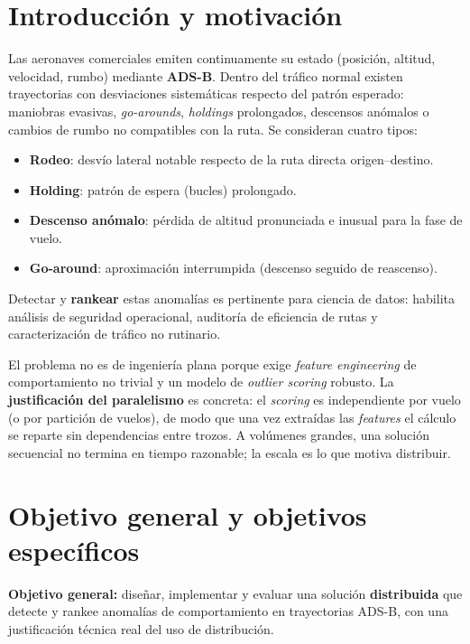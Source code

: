 \documentclass[letterpaper,11pt]{article}
\begin{document}
\section{Introducción y motivación}
Las aeronaves comerciales emiten continuamente su estado (posición, altitud, velocidad, rumbo) mediante
\textbf{ADS-B}. Dentro del tráfico normal existen trayectorias con desviaciones sistemáticas respecto del
patrón esperado: maniobras evasivas, \emph{go-arounds}, \emph{holdings} prolongados, descensos anómalos o
cambios de rumbo no compatibles con la ruta. Se consideran cuatro tipos:
\begin{itemize}[nosep,leftmargin=1.3em]
  \item \textbf{Rodeo}: desvío lateral notable respecto de la ruta directa origen--destino.
  \item \textbf{Holding}: patrón de espera (bucles) prolongado.
  \item \textbf{Descenso anómalo}: pérdida de altitud pronunciada e inusual para la fase de vuelo.
  \item \textbf{Go-around}: aproximación interrumpida (descenso seguido de reascenso).
\end{itemize}
Detectar y \textbf{rankear} estas anomalías es pertinente para ciencia de datos: habilita análisis de
seguridad operacional, auditoría de eficiencia de rutas y caracterización de tráfico no rutinario.

El problema no es de ingeniería plana porque exige \emph{feature engineering} de comportamiento no
trivial y un modelo de \emph{outlier scoring} robusto. La \textbf{justificación del paralelismo} es
concreta: el \emph{scoring} es independiente por vuelo (o por partición de vuelos), de modo que una vez
extraídas las \emph{features} el cálculo se reparte sin dependencias entre trozos. A volúmenes grandes,
una solución secuencial no termina en tiempo razonable; la escala es lo que motiva distribuir.

\section{Objetivo general y objetivos específicos}
\textbf{Objetivo general:} diseñar, implementar y evaluar una solución \textbf{distribuida} que detecte y
rankee anomalías de comportamiento en trayectorias ADS-B, con una justificación técnica real del uso de
distribución.
\end{document}
